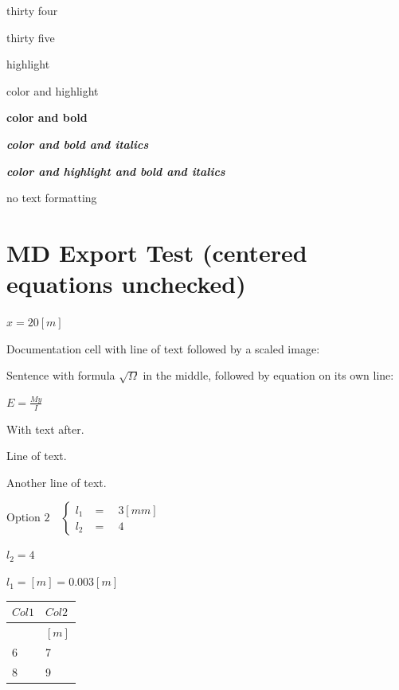 \documentclass[
  a4paper,
]{article}
\newcounter{none} %
\begin{document}
{\textcolor[HTML]{002966}{thirty four}}

{\textcolor[HTML]{3D1466}{thirty five}}

{\colorbox[HTML]{FFFF00}{highlight}}

{\textcolor[HTML]{E60000}{\colorbox[HTML]{FFFF00}{color and highlight}}}

\textbf{{\textcolor[HTML]{0066CC}{color and bold}}}

\emph{\textbf{{\textcolor[HTML]{0066CC}{color and bold and italics}}}}

\emph{\textbf{{\textcolor[HTML]{0066CC}{\colorbox[HTML]{FFFFCC}{color
and highlight and bold and italics}}}}}

no text formatting

\section{MD Export Test (centered equations
unchecked)}\label{md-export-test-centered-equations-unchecked}

\(x=20\left\lbrack m\right\rbrack\)

Documentation cell with line of text followed by a scaled image:

Sentence with formula \(\sqrt{\Omega}\) in the middle, followed by
equation on its own line:

\(E=\frac{My}{I}\)

With text after.

Line of text.

Another line of text.

\(\text{Option 2} \quad  \begin{cases} l_1 & = \quad 3 \left\lbrack mm\right\rbrack \\ l_2 & = \quad 4  \end{cases}\)

\(l_2= 4\)

\(l_1=\left\lbrack m\right\rbrack =0.003 \left\lbrack m\right\rbrack\)

{\def\LTcaptype{none} %
\begin{longtable}[]{@{}ll@{}}
\toprule\noalign{}
\(Col1\) & \(Col2\) \\
\midrule\noalign{}
\endhead
\bottomrule\noalign{}
\endlastfoot
& \(\left\lbrack m\right\rbrack\) \\
6 & 7 \\
8 & 9 \\
\end{longtable}
}
\end{document}
